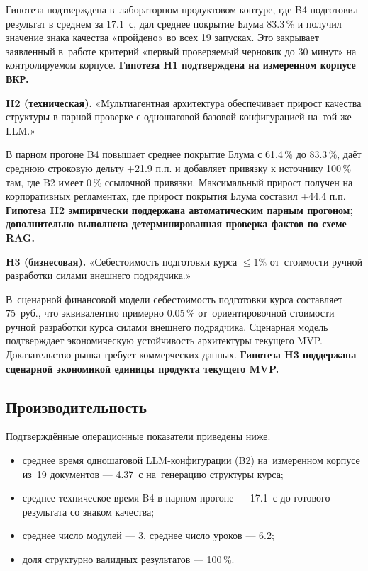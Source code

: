 Гипотеза подтверждена в~лабораторном продуктовом контуре, где
B4 подготовил результат в среднем за 17.1~с, дал среднее покрытие
Блума 83.3\,\% и получил значение знака качества «пройдено»
во всех 19 запусках. Это
закрывает заявленный в~работе критерий «первый проверяемый черновик
до 30 минут» на контролируемом корпусе.
\textbf{Гипотеза H1 подтверждена на измеренном корпусе ВКР.}

\textbf{H2 (техническая).}
«Мультиагентная архитектура обеспечивает прирост качества структуры
в парной проверке с одношаговой базовой конфигурацией на~той же LLM.»

В парном прогоне B4 повышает среднее покрытие Блума
с 61.4\,\% до 83.3\,\%, даёт среднюю строковую дельту +21.9 п.п.
и добавляет привязку к источнику 100\,\% там, где B2 имеет 0\,\%
ссылочной привязки. Максимальный прирост получен на корпоративных
регламентах, где прирост покрытия Блума составил +44.4 п.п.
\textbf{Гипотеза H2 эмпирически поддержана автоматическим парным прогоном;
дополнительно выполнена детерминированная проверка фактов по схеме RAG.}

\textbf{H3 (бизнесовая).}
«Себестоимость подготовки курса $\leq 1\%$ от~стоимости ручной разработки
силами внешнего подрядчика.»

В~сценарной финансовой модели себестоимость подготовки курса составляет
75~руб., что эквивалентно примерно 0.05\,\% от~ориентировочной стоимости
ручной разработки курса силами внешнего подрядчика.
Сценарная модель подтверждает экономическую устойчивость архитектуры
текущего MVP. Доказательство рынка требует коммерческих данных.
\textbf{Гипотеза H3 поддержана сценарной экономикой единицы продукта текущего MVP.}

\subsection{Производительность}

Подтверждённые операционные показатели приведены ниже.
\begin{itemize}
  \item среднее время одношаговой LLM-конфигурации (B2) на~измеренном корпусе из~19 документов —
    4.37~с на~генерацию структуры курса;
  \item среднее техническое время B4 в парном прогоне — 17.1~с
    до готового результата со знаком качества;
  \item среднее число модулей — 3, среднее число уроков — 6.2;
  \item доля структурно валидных результатов — 100\,\%.
\end{itemize}

